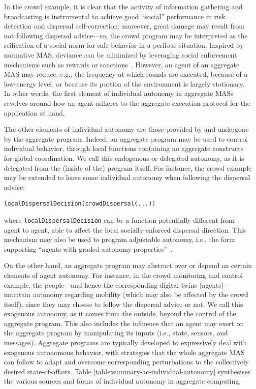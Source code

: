 \documentclass[jsan,article,accept,moreauthors,pdftex]{Definitions/mdpi}
\begin{document}
\begin{paracol}{2}
%
In the crowd example, 
 it is clear that the activity of information gathering and broadcasting
 is instrumental to achieve good ``social'' performance in risk detection
 and dispersal self-correction; moreover, great damage may result from {not} following dispersal advice---so, the crowd program may be interpreted as the reification of a social norm for safe behavior in a perilous situation.
%
Inspired by normative MAS, deviance can be minimized
 by leveraging social enforcement mechanisms
 such as rewards or sanctions~\cite{DBLP:journals/jasss/HollanderW11}.
%
However, an agent of an aggregate MAS may reduce, e.g.,
 the frequency at which rounds are executed,
 because of a low-energy level,
 or because its portion of the environment 
 is largely stationary.
%
In other words,
the first element of individual autonomy in aggregate MASs
 revolves around {how}
 an agent adheres to the aggregate execution protocol
 for the application at hand.

The other elements of individual autonomy
 are those {provided by} and {undergone by}
 the aggregate program.
%
Indeed, an aggregate program may be used to 
 control individual behavior,
 through {local functions}
 containing no aggregate constructs for global coordination.
%
We call this {endogenous} or {delegated autonomy},
 as it is delegated from the (inside of the) program itself.
%
For instance, the crowd example may be extended to leave some individual autonomy when following the dispersal advice:
\begin{lstlisting}
localDispersalDecision(crowdDispersal(...))
\end{lstlisting}
%
where \lstinline|localDispersalDecision| can be a function potentially different from agent to agent, able to affect the local socially-enforced dispersal direction.
%
This mechanism may also be used to program {adjustable autonomy}, i.e., the form 
 supporting ``agents with graded autonomy properties''~\cite{DBLP:journals/air/MostafaAM19}.

On the other hand, an aggregate program may {abstract over} or {depend on} certain elements of agent autonomy.
%
For instance, in the crowd monitoring and control example,
 the people---and hence the corresponding digital twins (agents)---maintain autonomy regarding mobility (which may also be affected by the crowd itself), since they may choose to follow the dispersal advice or not.
%
We call this {exogenous autonomy},
 as it comes from the outside,
 beyond the control of the aggregate program.
%
This also includes the influence that an agent
 may exert on the aggregate program
 by manipulating its inputs
 (i.e., state, sensors, and messages).
%
Aggregate programs are typically developed 
 to expressively {deal with} exogenous autonomous behavior,
 with strategies that the whole aggregate MAS can follow
 to adapt and overcome corresponding perturbations
 to the collectively desired state-of-affairs.
%
Table \ref{table:summary-ac-individual-autonomy} synthesises the various sources and forms of individual autonomy in aggregate computing.



\end{paracol}
\end{document}
